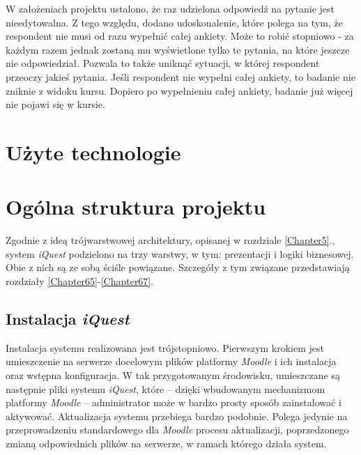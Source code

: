 W założeniach projektu ustalono, że raz udzielona odpowiedź na pytanie jest nieedytowalna. Z tego względu, dodano udoskonalenie, które polega na tym, że respondent nie musi od razu wypełnić całej ankiety. Może to robić stopniowo - za każdym razem jednak zostaną mu wyświetlone tylko te pytania, na które jeszcze nie odpowiedział. Pozwala to także uniknąć sytuacji, w której respondent przeoczy jakieś pytania. Jeśli respondent nie wypełni całej ankiety, to badanie nie zniknie z widoku kursu. Dopiero po wypełnieniu całej ankiety, badanie już więcej nie pojawi się w kursie.

\section{Użyte technologie}
\label{Chapter63}




\section{Ogólna struktura projektu}
\label{Chapter64}

Zgodnie z ideą trójwarstwowej architektury, opisanej w rozdziale \ref{Chapter5}., system \textit{iQuest} podzielono na trzy warstwy, w tym: prezentacji i logiki biznesowej. Obie z nich są ze sobą ściśle powiązane. Szczegóły z tym związane przedstawiają rozdziały \ref{Chapter65}-\ref{Chapter67}.





\subsection{Instalacja \textit{iQuest}}
\label{Chapter68}
Instalacja systemu realizowana jest trójstopniowo. Pierwszym krokiem jest umieszczenie na serwerze docelowym plików platformy \textit{Moodle} i ich instalacja oraz wstępna konfiguracja. W tak przygotowanym środowisku, umieszczane są następnie pliki systemu \textit{iQuest}, które -- dzięki wbudowanym mechanizmom platformy \textit{Moodle} -- administrator może w bardzo prosty sposób zainstalować i aktywować. Aktualizacja systemu przebiega bardzo podobnie. Polega jedynie na przeprowadzeniu standardowego dla \textit{Moodle} procesu aktualizacji, poprzedzonego zmianą odpowiednich plików na serwerze, w ramach którego działa system.